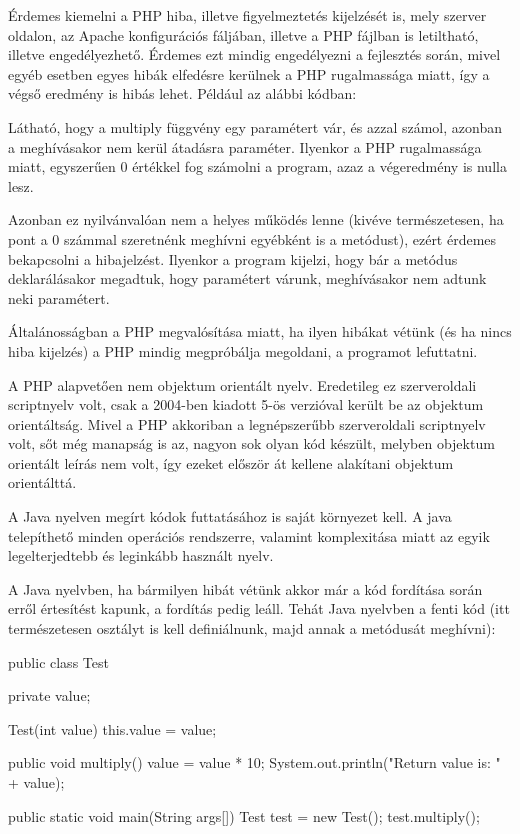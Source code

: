 Érdemes kiemelni a PHP hiba, illetve figyelmeztetés kijelzését is, mely szerver oldalon, az Apache konfigurációs fáljában, illetve a PHP fájlban is letiltható, illetve engedélyezhető. Érdemes ezt mindig engedélyezni a fejlesztés során, mivel egyéb esetben egyes hibák elfedésre kerülnek a PHP rugalmassága miatt, így a végső eredmény is hibás lehet. Például az alábbi kódban:


Látható, hogy a multiply függvény egy paramétert vár, és azzal számol, azonban a meghívásakor nem kerül átadásra paraméter. Ilyenkor a PHP rugalmassága miatt, egyszerűen 0 értékkel fog számolni a program, azaz a végeredmény is nulla lesz.

Azonban ez nyilvánvalóan nem a helyes működés lenne (kivéve természetesen, ha pont a 0 számmal szeretnénk meghívni egyébként is a metódust), ezért érdemes bekapcsolni a hibajelzést. Ilyenkor a program kijelzi, hogy bár a metódus deklarálásakor megadtuk, hogy paramétert várunk, meghívásakor nem adtunk neki paramétert.

Általánosságban a PHP megvalósítása miatt, ha ilyen hibákat vétünk (és ha nincs hiba kijelzés) a PHP mindig megpróbálja megoldani, a programot lefuttatni.

A PHP alapvetően nem objektum orientált nyelv. Eredetileg ez szerveroldali scriptnyelv volt, csak a 2004-ben kiadott 5-ös verzióval került be az objektum orientáltság. Mivel a PHP akkoriban a legnépszerűbb szerveroldali scriptnyelv volt, sőt még manapság is az, nagyon sok olyan kód készült, melyben objektum orientált leírás nem volt, így ezeket először át kellene alakítani objektum orientálttá.

A Java nyelven megírt kódok futtatásához is saját környezet kell. A java telepíthető minden operációs rendszerre, valamint komplexitása miatt az egyik legelterjedtebb és leginkább használt nyelv.

A Java nyelvben, ha bármilyen hibát vétünk akkor már a kód fordítása során erről értesítést kapunk, a fordítás pedig leáll. Tehát Java nyelvben a fenti kód (itt természetesen osztályt is kell definiálnunk, majd annak a metódusát meghívni):

\begin{cpp}
public class Test {
    private value;
    
    Test(int value) {
        this.value = value;
    }

   public void multiply() {
      value = value * 10;
      System.out.println("Return value is: " + value);
   }

   public static void main(String args[]) {
      Test test = new Test();
      test.multiply();
   }
}
\end{cpp}

